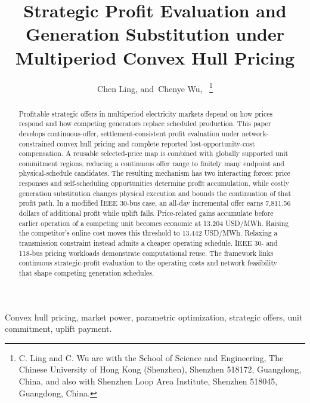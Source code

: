 \documentclass[journal]{IEEEtran}
\begin{document}
\title{Strategic Profit Evaluation and Generation Substitution under Multiperiod Convex Hull Pricing}
\author{Chen Ling, and~Chenye Wu,~%
\thanks{C. Ling and C. Wu are with the School of Science and Engineering, The Chinese University of Hong Kong (Shenzhen), Shenzhen 518172, Guangdong, China, and also with Shenzhen Loop Area Institute, Shenzhen 518045, Guangdong, China.}}
\maketitle

\begin{abstract}
Profitable strategic offers in multiperiod electricity markets depend on how prices respond and how competing generators replace scheduled production. This paper develops continuous-offer, settlement-consistent profit evaluation under network-constrained convex hull pricing and complete reported lost-opportunity-cost compensation. A reusable selected-price map is combined with globally supported unit commitment regions, reducing a continuous offer range to finitely many endpoint and physical-schedule candidates. The resulting mechanism has two interacting forces: price responses and self-scheduling opportunities determine profit accumulation, while costly generation substitution changes physical execution and bounds the continuation of that profit path. In a modified IEEE 30-bus case, an all-day incremental offer earns 7,811.56 dollars of additional profit while uplift falls. Price-related gains accumulate before earlier operation of a competing unit becomes economic at 13.204 USD/MWh. Raising the competitor's online cost moves this threshold to 13.442 USD/MWh. Relaxing a transmission constraint instead admits a cheaper operating schedule. IEEE 30- and 118-bus pricing workloads demonstrate computational reuse. The framework links continuous strategic-profit evaluation to the operating costs and network feasibility that shape competing generation schedules.
\end{abstract}
\begin{IEEEkeywords}
Convex hull pricing, market power, parametric optimization, strategic offers, unit commitment, uplift payment.
\end{IEEEkeywords}
\end{document}
